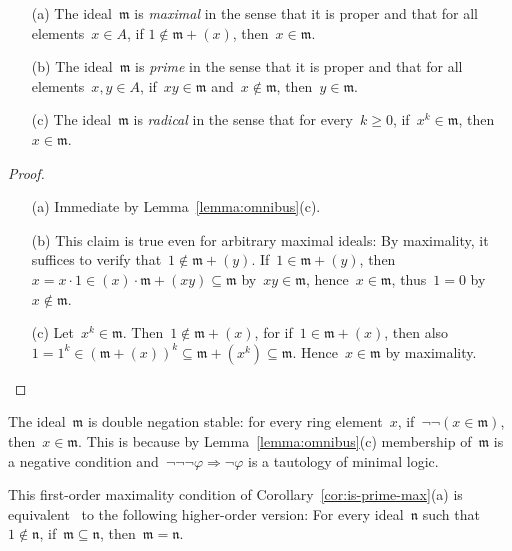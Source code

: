 \documentclass[envcountsect,envcountsame,runningheads]{llncs}
\newcommand{\mmm}{\mathfrak{m}}
\newcommand{\nnn}{\mathfrak{n}}
\renewcommand{\_}{\mathpunct{.}\,}
\begin{document}
\begin{corollary}\label{cor:is-prime-max}
\begin{enumerate}
\item[\textnormal{(a)}] The ideal~$\mmm$ is \emph{maximal} in the sense that it is proper and that for
all elements~$x \in A$, if $1 \not\in \mmm + (x)$, then~$x \in \mmm$.
\item[\textnormal{(b)}] The ideal~$\mmm$ is \emph{prime} in the
sense that it is proper and that for
all elements~$x,y \in A$, if~$xy \in \mmm$ and~$x \not\in \mmm$, then~$y \in
\mmm$.
\item[\textnormal{(c)}] The ideal~$\mmm$ is \emph{radical} in the sense that for every~$k \geq 0$, if~$x^k \in
\mmm$, then~$x \in \mmm$.
\end{enumerate}
\end{corollary}

\begin{proof}\begin{enumerate}
\item[(a)] Immediate by Lemma~\ref{lemma:omnibus}(c).
\item[(b)] This claim is true even for arbitrary maximal ideals: By maximality, it suffices to verify that~$1 \not\in
\mmm + (y)$. If~$1 \in \mmm + (y)$, then~$x = x\cdot1 \in (x) \cdot \mmm + (xy)
\subseteq \mmm$ by~$xy \in \mmm$, hence~$x \in \mmm$, thus~$1 = 0$ by~$x \not\in
\mmm$.
\item[(c)] Let~$x^k \in \mmm$. Then~$1 \not\in \mmm + (x)$, for if~$1 \in
\mmm + (x)$, then also~$1 = 1^k \in (\mmm + (x))^k \subseteq \mmm + (x^k)
\subseteq \mmm$. Hence~$x \in \mmm$ by maximality.
\end{enumerate}
\end{proof}

\begin{remark}The ideal~$\mmm$ is double negation stable: for every
ring element~$x$, if~$\neg\neg(x \in \mmm)$, then~$x \in \mmm$. This is because
by Lemma~\ref{lemma:omnibus}(c) membership of~$\mmm$ is a negative condition
and~$\neg\neg\neg\varphi \Rightarrow \neg\varphi$ is a tautology of minimal
logic.\end{remark}

This first-order maximality condition of Corollary~\ref{cor:is-prime-max}(a) is
equivalent~\cite{berardi-valentini:krivine} to the following higher-order version: For every ideal~$\nnn$ such that~$1
\not\in \nnn$, if~$\mmm \subseteq \nnn$, then~$\mmm = \nnn$.
\end{document}
